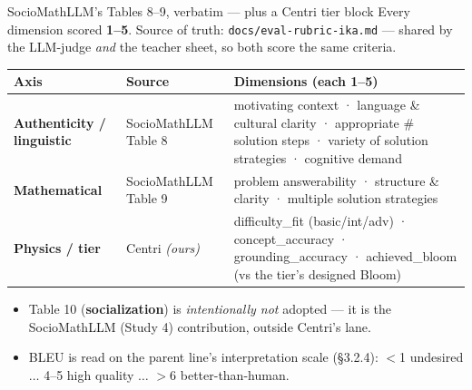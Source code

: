 \documentclass[aspectratio=169,10pt]{beamer}
\begin{document}
\begin{frame}{SocioMathLLM's Tables 8--9, verbatim --- plus a Centri tier block}
\scriptsize
Every dimension scored \textbf{1--5}. Source of truth: \texttt{docs/eval-rubric-ika.md}
--- shared by the LLM-judge \emph{and} the teacher sheet, so both score the same criteria.
\vspace{0.3em}
\renewcommand{\arraystretch}{1.35}
\begin{center}
\begin{tabular}{@{}p{2.7cm}p{2.0cm}p{7.2cm}@{}}
\toprule
\textbf{Axis} & \textbf{Source} & \textbf{Dimensions (each 1--5)} \\
\midrule
\textbf{\color{cPed}Authenticity / linguistic} & SocioMathLLM Table 8 &
motivating context · language \& cultural clarity · appropriate \# solution steps ·
variety of solution strategies · cognitive demand \\
\textbf{\color{cMeas}Mathematical} & SocioMathLLM Table 9 &
problem answerability · structure \& clarity · multiple solution strategies \\
\textbf{\color{cApp}Physics / tier} & Centri \emph{(ours)} &
difficulty\_fit (basic/int/adv) · concept\_accuracy · grounding\_accuracy ·
achieved\_bloom (vs the tier's designed Bloom) \\
\bottomrule
\end{tabular}
\end{center}
\vspace{0.5em}
\begin{itemize}\setlength\itemsep{2pt}
  \item Table 10 (\textbf{socialization}) is \emph{intentionally not} adopted --- it is the SocioMathLLM
  (Study 4) contribution, outside Centri's lane.
  \item BLEU is read on the parent line's interpretation scale (§3.2.4): $<$1 undesired $\ldots$ 4--5 high
  quality $\ldots$ $>$6 better-than-human.
\end{itemize}
\end{frame}
\end{document}
